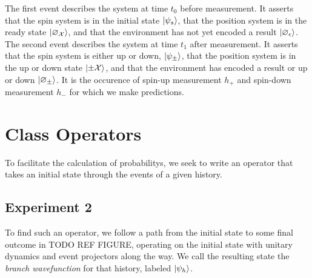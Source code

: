 The first event describes the system at time $t_0$ before measurement. It asserts that the spin system is in the initial state $\ket{\psi_s}$, that the position system is in the ready state ${\ket{\varnothing_\mathcal{X}}}$, and that the environment has not yet encoded a result $\ket{\varnothing_\epsilon}$. The second event describes the system at time $t_1$ after measurement. It asserts that the spin system is either up or down, $\ket{\psi_\pm}$, that the position system is in the up or down state ${\ket{\pm\mathcal{X}}}$, and that the environment has encoded a result or up or down $\ket{\varnothing_\pm}$. It is the occurence of spin-up measurement $h_+$ and spin-down measurement $h_-$ for which we make predictions.

\section{Class Operators}

To facilitate the calculation of probabilitys, we seek to write an operator that takes an initial state through the events of a given history.

\subsection{Experiment 2}

To find such an operator, we follow a path from the initial state to some final outcome in TODO REF FIGURE, operating on the initial state with unitary dynamics and event projectors along the way. We call the resulting state the \textit{branch wavefunction} for that history, labeled $\ket{\psi_h}$.

